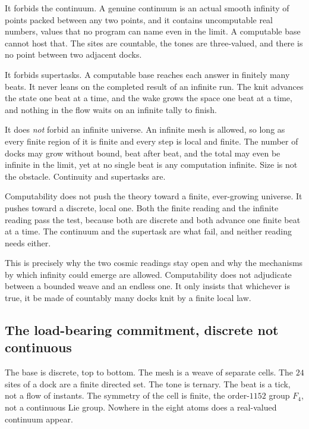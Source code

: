 It forbids the continuum. A genuine continuum is an actual smooth infinity of points packed between any two points, and it contains uncomputable real numbers, values that no program can name even in the limit. A computable base cannot host that. The sites are countable, the tones are three-valued, and there is no point between two adjacent docks.

It forbids supertasks. A computable base reaches each answer in finitely many beats. It never leans on the completed result of an infinite run. The knit advances the state one beat at a time, and the wake grows the space one beat at a time, and nothing in the flow waits on an infinite tally to finish.

It does \emph{not} forbid an infinite universe. An infinite mesh is allowed, so long as every finite region of it is finite and every step is local and finite. The number of docks may grow without bound, beat after beat, and the total may even be infinite in the limit, yet at no single beat is any computation infinite. Size is not the obstacle. Continuity and supertasks are.

\begin{principle}
Computability does not push the theory toward a finite, ever-growing universe. It pushes toward a discrete, local one. Both the finite reading and the infinite reading pass the test, because both are discrete and both advance one finite beat at a time. The continuum and the supertask are what fail, and neither reading needs either.
\end{principle}

This is precisely why the two cosmic readings stay open and why the mechanisms by which infinity could emerge are allowed. Computability does not adjudicate between a bounded weave and an endless one. It only insists that whichever is true, it be made of countably many docks knit by a finite local law.

\subsection{The load-bearing commitment, discrete not continuous}

The base is discrete, top to bottom. The mesh is a weave of separate cells. The $24$ sites of a dock are a finite directed set. The tone is ternary. The beat is a tick, not a flow of instants. The symmetry of the cell is finite, the order-$1152$ group $F_4$, not a continuous Lie group. Nowhere in the eight atoms does a real-valued continuum appear.

